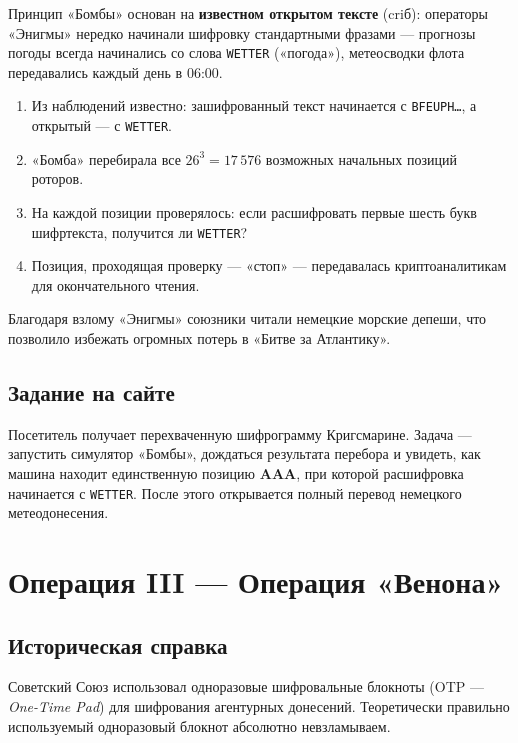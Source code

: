 \documentclass[12pt, a4paper]{article}
\begin{document}
Принцип «Бомбы» основан на \textbf{известном открытом тексте} (criб):
операторы «Энигмы» нередко начинали шифровку стандартными фразами ---
прогнозы погоды всегда начинались со слова \texttt{WETTER} («погода»),
метеосводки флота передавались каждый день в 06:00.

\begin{enumerate}[leftmargin=1.5cm]
  \item Из наблюдений известно: зашифрованный текст начинается с
        \texttt{BFEUPH\ldots}, а открытый --- с \texttt{WETTER}.
  \item «Бомба» перебирала все $26^3 = 17\,576$ возможных начальных позиций
        роторов.
  \item На каждой позиции проверялось: если расшифровать первые шесть букв
        шифртекста, получится ли \texttt{WETTER}?
  \item Позиция, проходящая проверку --- «стоп» --- передавалась
        криптоаналитикам для окончательного чтения.
\end{enumerate}

Благодаря взлому «Энигмы» союзники читали немецкие морские депеши, что
позволило избежать огромных потерь в «Битве за Атлантику».

\subsection{Задание на сайте}

Посетитель получает перехваченную шифрограмму Кригсмарине. Задача ---
запустить симулятор «Бомбы», дождаться результата перебора и увидеть, как
машина находит единственную позицию \textbf{AAA}, при которой расшифровка
начинается с \texttt{WETTER}. После этого открывается полный перевод немецкого
метеодонесения.

\section{Операция III — Операция «Венона»}

\subsection{Историческая справка}

Советский Союз использовал одноразовые шифровальные блокноты (OTP ---
\textit{One-Time Pad}) для шифрования агентурных донесений. Теоретически
правильно используемый одноразовый блокнот абсолютно невзламываем.
\end{document}
